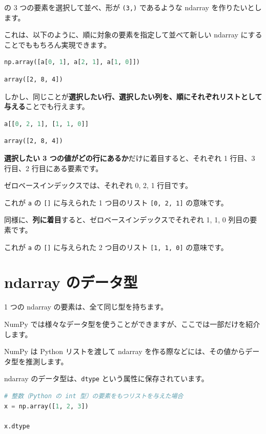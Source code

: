 の 3 つの要素を選択して並べ、形が \texttt{(3,)} であるような ndarray を作りたいとします。


これは、以下のように、順に対象の要素を指定して並べて新しい ndarray にすることでももちろん実現できます。


\begin{lstlisting}[style=codecell,language=Python]
np.array([a[0, 1], a[2, 1], a[1, 0]])
\end{lstlisting}

\begin{lstlisting}[style=outputcell]
array([2, 8, 4])
\end{lstlisting}

しかし、同じことが\textbf{選択したい行、選択したい列を、順にそれぞれリストとして与える}ことでも行えます。


\begin{lstlisting}[style=codecell,language=Python]
a[[0, 2, 1], [1, 1, 0]]
\end{lstlisting}

\begin{lstlisting}[style=outputcell]
array([2, 8, 4])
\end{lstlisting}

\textbf{選択したい 3 つの値がどの行にあるか}だけに着目すると、それぞれ 1 行目、3 行目、2 行目にある要素です。

ゼロベースインデックスでは、それぞれ 0, 2, 1 行目です。

これが \texttt{a} の \texttt{[]} に与えられた 1 つ目のリスト \texttt{[0, 2, 1]} の意味です。


同様に、\textbf{列に着目}すると、ゼロベースインデックスでそれぞれ 1, 1, 0 列目の要素です。

これが \texttt{a} の \texttt{[]} に与えられた 2 つ目のリスト \texttt{[1, 1, 0]} の意味です。


\section{ndarray のデータ型}


1 つの ndarray の要素は、全て同じ型を持ちます。

NumPy では様々なデータ型を使うことができますが、ここでは一部だけを紹介します。

NumPy は Python リストを渡して ndarray を作る際などには、その値からデータ型を推測します。

ndarray のデータ型は、\texttt{dtype} という属性に保存されています。


\begin{lstlisting}[style=codecell,language=Python]
# 整数（Python の int 型）の要素をもつリストを与えた場合
x = np.array([1, 2, 3])

x.dtype
\end{lstlisting}


